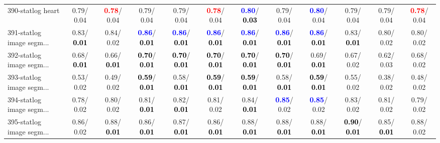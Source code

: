 \begin{table}[h]
\begin{center}
{\begin{tabular}{lc|c|c|c|c|c|c|c|c|c|c}
390-statlog heart &   0.79/  0.04 & \textcolor{red}{\textbf{  0.78}}/  0.04 &   0.79/  0.04 &   0.79/  0.04 & \textcolor{red}{\textbf{  0.78}}/  0.04 & \textcolor{blue}{\textbf{  0.80}}/\textcolor{black}{\textbf{  0.03}} &   0.79/  0.04 & \textcolor{blue}{\textbf{  0.80}}/  0.04 &   0.79/  0.04 &   0.79/  0.04 & \textcolor{red}{\textbf{  0.78}}/  0.04 \\
391-statlog image segm... &   0.83/\textcolor{black}{\textbf{  0.01}} &   0.84/  0.02 & \textcolor{blue}{\textbf{  0.86}}/\textcolor{black}{\textbf{  0.01}} & \textcolor{blue}{\textbf{  0.86}}/\textcolor{black}{\textbf{  0.01}} & \textcolor{blue}{\textbf{  0.86}}/\textcolor{black}{\textbf{  0.01}} & \textcolor{blue}{\textbf{  0.86}}/\textcolor{black}{\textbf{  0.01}} & \textcolor{blue}{\textbf{  0.86}}/\textcolor{black}{\textbf{  0.01}} & \textcolor{blue}{\textbf{  0.86}}/\textcolor{black}{\textbf{  0.01}} &   0.83/\textcolor{black}{\textbf{  0.01}} &   0.80/  0.02 &   0.80/  0.02 \\ \hline
392-statlog image segm... &   0.68/\textcolor{black}{\textbf{  0.01}} &   0.66/\textcolor{black}{\textbf{  0.01}} & \textcolor{black}{\textbf{  0.70}}/\textcolor{black}{\textbf{  0.01}} & \textcolor{black}{\textbf{  0.70}}/\textcolor{black}{\textbf{  0.01}} & \textcolor{black}{\textbf{  0.70}}/\textcolor{black}{\textbf{  0.01}} & \textcolor{black}{\textbf{  0.70}}/\textcolor{black}{\textbf{  0.01}} & \textcolor{black}{\textbf{  0.70}}/\textcolor{black}{\textbf{  0.01}} &   0.69/\textcolor{black}{\textbf{  0.01}} &   0.67/  0.02 &   0.62/  0.03 &   0.68/  0.02 \\
393-statlog image segm... &   0.53/  0.02 &   0.49/  0.02 & \textcolor{black}{\textbf{  0.59}}/\textcolor{black}{\textbf{  0.01}} &   0.58/\textcolor{black}{\textbf{  0.01}} & \textcolor{black}{\textbf{  0.59}}/\textcolor{black}{\textbf{  0.01}} & \textcolor{black}{\textbf{  0.59}}/\textcolor{black}{\textbf{  0.01}} &   0.58/\textcolor{black}{\textbf{  0.01}} & \textcolor{black}{\textbf{  0.59}}/\textcolor{black}{\textbf{  0.01}} &   0.55/  0.02 &   0.38/  0.02 &   0.48/  0.02 \\
394-statlog image segm... &   0.78/  0.02 &   0.80/  0.02 &   0.81/\textcolor{black}{\textbf{  0.01}} &   0.82/\textcolor{black}{\textbf{  0.01}} &   0.81/  0.02 &   0.84/\textcolor{black}{\textbf{  0.01}} & \textcolor{blue}{\textbf{  0.85}}/  0.02 & \textcolor{blue}{\textbf{  0.85}}/  0.02 &   0.83/  0.02 &   0.81/  0.02 &   0.79/  0.02 \\
395-statlog image segm... &   0.86/  0.02 &   0.88/\textcolor{black}{\textbf{  0.01}} &   0.86/\textcolor{black}{\textbf{  0.01}} &   0.87/\textcolor{black}{\textbf{  0.01}} &   0.86/\textcolor{black}{\textbf{  0.01}} &   0.88/\textcolor{black}{\textbf{  0.01}} &   0.88/\textcolor{black}{\textbf{  0.01}} &   0.88/\textcolor{black}{\textbf{  0.01}} & \textcolor{black}{\textbf{  0.90}}/\textcolor{black}{\textbf{  0.01}} &   0.85/\textcolor{black}{\textbf{  0.01}} &   0.88/  0.02 \\

\end{tabular}}
\end{center}
\end{table}
